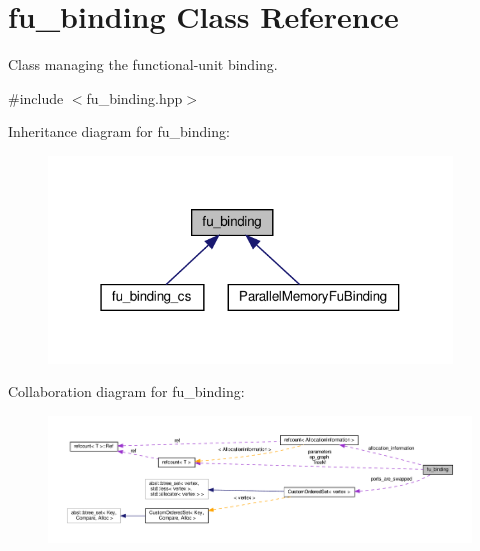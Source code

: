 \hypertarget{classfu__binding}{}\section{fu\+\_\+binding Class Reference}
\label{classfu__binding}


Class managing the functional-\/unit binding.  




{\ttfamily \#include $<$fu\+\_\+binding.\+hpp$>$}



Inheritance diagram for fu\+\_\+binding\+:
\nopagebreak
\begin{figure}[H]
\begin{center}
\leavevmode
\includegraphics[width=304pt]{d5/d18/classfu__binding__inherit__graph}
\end{center}
\end{figure}


Collaboration diagram for fu\+\_\+binding\+:
\nopagebreak
\begin{figure}[H]
\begin{center}
\leavevmode
\includegraphics[width=350pt]{d8/d55/classfu__binding__coll__graph}
\end{center}
\end{figure}
